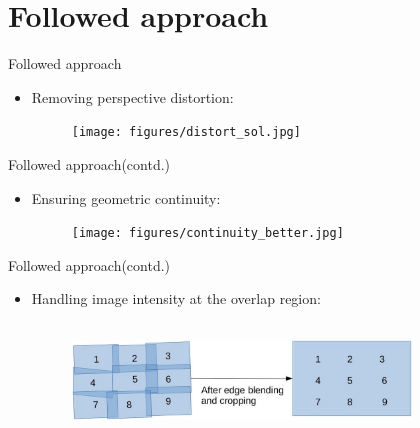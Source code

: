 \documentclass[40pt]{beamer}
\begin{document}
\section{Followed approach}
\begin{frame}{Followed approach}
\begin{itemize}
\item Removing perspective distortion:
\begin{figure}
\texttt{[image: figures/distort\_sol.jpg]}
\end{figure}
\end{itemize}
\end{frame}


\begin{frame}{Followed approach(contd.)}
\begin{itemize}
\item Ensuring geometric continuity:
\begin{figure}
\texttt{[image: figures/continuity\_better.jpg]}
\end{figure}
\end{itemize}
\end{frame}



\begin{frame}{Followed approach(contd.)}
\begin{itemize}
\item Handling image intensity at the overlap region:
\begin{figure}
\includegraphics[width=9cm,height=3cm]{figures/blending.jpg}
\end{figure}
\end{itemize}
\end{frame}

\end{document}
